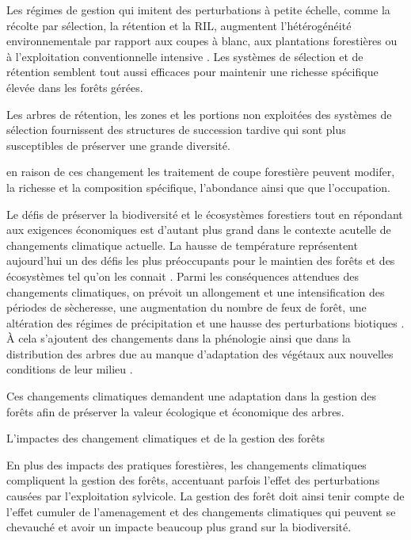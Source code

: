 Les régimes de gestion qui imitent des perturbations à petite échelle, comme la récolte par sélection, la rétention et la RIL, augmentent l'hétérogénéité environnementale par rapport aux coupes à blanc, aux plantations forestières ou à l'exploitation conventionnelle intensive \citep{Oheimb2009Selectionharvest,Gustafsson2010Treeretention}. 
Les systèmes de sélection et de rétention semblent tout aussi efficaces pour maintenir une richesse spécifique élevée dans les forêts gérées. 

Les arbres de rétention, les zones et les portions non exploitées des systèmes de sélection fournissent des structures de succession tardive qui sont plus susceptibles de préserver une grande diversité.


 en raison de ces changement les traitement de coupe forestière peuvent modifer, la richesse et la composition spécifique, l'abondance ainsi que que l'occupation. 



Le défis de préserver la biodiversité et le écosystèmes forestiers tout en répondant aux exigences économiques est d'autant plus grand dans le contexte acutelle de changements climatique actuelle. 
La hausse de température représentent aujourd'hui un des défis les plus préoccupants pour le maintien des forêts et des écosystèmes tel qu'on les connait \citep{McKenney2009Climatechange,Trumbore2015Foresthealth,Seidl2017Forestdisturbances,Messier2022Warningnatural}.  
Parmi les conséquences attendues des changements climatiques, on prévoit un allongement et une intensification des périodes de sècheresse, une augmentation du nombre de feux de forêt, une altération des régimes de précipitation et une hausse des perturbations biotiques \citep{Parmesan2007Influencesspecies,Joyce2013Climatechange,Gatti2021Amazoniacarbon,Heidari2021Effectsclimate}. 
À cela s'ajoutent des changements dans la phénologie ainsi que dans la distribution des arbres due au manque d'adaptation des végétaux aux nouvelles conditions de leur milieu \citep{Aitken2008Adaptationmigration,Chuine2010Whydoes,Zhu2012Failuremigrate,Gray2013Trackingsuitable}.

Ces changements climatiques demandent une adaptation dans la gestion des forêts afin de préserver la valeur écologique et économique des arbres. 




L'impactes des changement climatiques et de la gestion des forêts 

En plus des impacts des pratiques forestières, les changements climatiques compliquent la gestion des forêts, accentuant parfois l'effet des perturbations causées par l'exploitation sylvicole. 
La gestion des forêt doit ainsi tenir compte de l'effet cumuler de l'amenagement et des changements climatiques qui peuvent se chevauché et avoir un impacte beaucoup plus grand sur la biodiversité.


